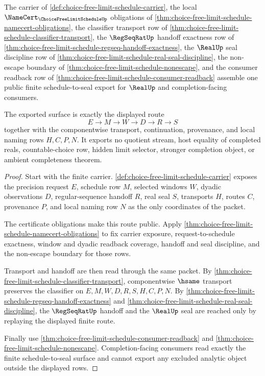 \begin{theorem}
\label{thm:choice-free-limit-schedule-public-seal-export}
The carrier of \autoref{def:choice-free-limit-schedule-carrier}, the local $\NameCert_{\ChoiceFreeLimitScheduleUp}$ obligations of \autoref{thm:choice-free-limit-schedule-namecert-obligations}, the classifier transport row of \autoref{thm:choice-free-limit-schedule-classifier-transport}, the $\RegSeqRatUp$ handoff exactness row of \autoref{thm:choice-free-limit-schedule-regseq-handoff-exactness}, the $\RealUp$ seal discipline row of \autoref{thm:choice-free-limit-schedule-real-seal-discipline}, the non-escape boundary of \autoref{thm:choice-free-limit-schedule-nonescape}, and the consumer readback row of \autoref{thm:choice-free-limit-schedule-consumer-readback} assemble one public finite schedule-to-seal export for $\RealUp$ and completion-facing consumers.

The exported surface is exactly the displayed route
$$
E \to M \to W \to D \to R \to S
$$
together with the componentwise transport, continuation, provenance, and local naming rows $H,C,P,N$. It exports no quotient stream, host equality of completed reals, countable-choice row, hidden limit selector, stronger completion object, or ambient completeness theorem.
\end{theorem}
\begin{proof}
Start with the finite carrier. \autoref{def:choice-free-limit-schedule-carrier} exposes the precision request $E$, schedule row $M$, selected windows $W$, dyadic observations $D$, regular-sequence handoff $R$, real seal $S$, transports $H$, routes $C$, provenance $P$, and local naming row $N$ as the only coordinates of the packet.

The certificate obligations make this route public. Apply \autoref{thm:choice-free-limit-schedule-namecert-obligations} to fix carrier exposure, request-to-schedule exactness, window and dyadic readback coverage, handoff and seal discipline, and the non-escape boundary for those rows.

Transport and handoff are then read through the same packet. By \autoref{thm:choice-free-limit-schedule-classifier-transport}, componentwise $\hsame$ transport preserves the classifier on $E,M,W,D,R,S,H,C,P,N$. By \autoref{thm:choice-free-limit-schedule-regseq-handoff-exactness} and \autoref{thm:choice-free-limit-schedule-real-seal-discipline}, the $\RegSeqRatUp$ handoff and the $\RealUp$ seal are reached only by replaying the displayed finite route.

Finally use \autoref{thm:choice-free-limit-schedule-consumer-readback} and \autoref{thm:choice-free-limit-schedule-nonescape}. Completion-facing consumers read exactly the finite schedule-to-seal surface and cannot export any excluded analytic object outside the displayed rows.
\end{proof}

